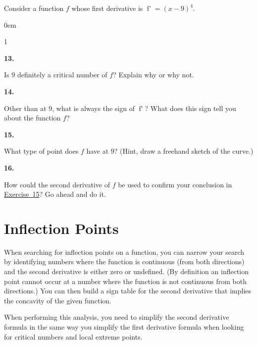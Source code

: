 \documentclass[12pt,]{book}
\theoremstyle{plain}
\theoremstyle{definition}
\numberwithin{equation}{section}
\newenvironment{exercisegroup}%
{\medskip\noindent}%
{\par\bigskip}%
\newlength{\exercisegroupindent}%
\newlength{\exercisegroupitemwidth}%
\newenvironment{exercisegrouplist}%
{\vspace{-\partopsep}%
\begin{adjustwidth}{\exercisegroupindent}{0em}}%
{\end{adjustwidth}%
\vspace{-\partopsep}%
\vspace{\baselineskip}}%
\newenvironment{exercisegroupbycol}[1]%
{\begin{exercisegrouplist}%
\vspace{-\multicolsep}%
\begin{multicols}{#1}%
\setlength{\parindent}{0em}%
\setlength{\exercisegroupitemwidth}{\linewidth}}%
{\end{multicols}%
\vspace{-\multicolsep}%
\end{exercisegrouplist}}%
\newenvironment{exercisegroupitem}[1]%
{\begin{minipage}[t]{\exercisegroupitemwidth}
\vspace{0pt}%
{\bfseries#1}%
\rule{0pt}{\baselineskip}}{\strut%
\end{minipage}%
\hspace{\columnsep}}%
\providecommand\phantomsection{}
\newcommand{\fe}[2]{\mathop{{#1}{\left(#2\right)}}}
\newcommand{\fd}[1]{#1'}
\begin{document}
\begin{exercisegroup}%
Consider a function \(f\) whose first derivative is \(\fe{\fd{f}}{x}=(x-9)^4\).%
\par
\begin{exercisegroupbycol}{1}%
\begin{exercisegroupitem}{13. }\phantomsection\hypertarget{exercise-424}{\null}
Is \(9\) definitely a critical number of \(f\)? Explain why or why not.%
\end{exercisegroupitem}%
\par%
\begin{exercisegroupitem}{14. }\phantomsection\hypertarget{exercise-425}{\null}
Other than at \(9\), what is always the sign of \(\fe{\fd{f}}{x}\)? What does this sign tell you about the function \(f\)?%
\end{exercisegroupitem}%
\par%
\begin{exercisegroupitem}{15. }\phantomsection\hypertarget{exercise-what-type-of-critical-point}{\null}
What type of point does \(f\) have at \(9\)? (Hint, draw a freehand sketch of the curve.)%
\end{exercisegroupitem}%
\par%
\begin{exercisegroupitem}{16. }\phantomsection\hypertarget{exercise-427}{\null}
How could the second derivative of \(f\) be used to confirm your conclusion in \hyperref[exercise-what-type-of-critical-point]{Exercise~15}?  Go ahead and do it.%
\end{exercisegroupitem}%
\par%
\end{exercisegroupbycol}%
\end{exercisegroup}%
\typeout{************************************************}
\typeout{************************************************}
\section[Inflection Points]{Inflection Points}\label{section-inflection-points}
When searching for inflection points on a function, you can narrow your search by identifying numbers where the function is continuous (from both directions) and the second derivative is either zero or undefined.  (By definition an inflection point cannot occur at a number where the function is not continuous from both directions.)  You can then build a sign table for the second derivative that implies the concavity of the given function.%
\par
When performing this analysis, you need to simplify the second derivative formula in the same way you simplify the first derivative formula when looking for critical numbers and local extreme points.%
\typeout{************************************************}
\typeout{************************************************}
\end{document}
